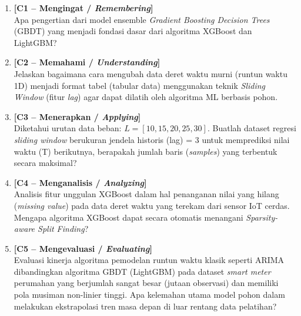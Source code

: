 \documentclass[11pt,a4paper]{article}
\begin{document}
\begin{enumerate}[leftmargin=1.8em, label=\textbf{Soal \arabic*.}]
    
    \item \textbf{[C1 -- Mengingat / \textit{Remembering}]} \\
    Apa pengertian dari model ensemble \textit{Gradient Boosting Decision Trees} (GBDT) yang menjadi fondasi dasar dari algoritma XGBoost dan LightGBM?
    \vspace{2.2cm}

    \item \textbf{[C2 -- Memahami / \textit{Understanding}]} \\
    Jelaskan bagaimana cara mengubah data deret waktu murni (runtun waktu 1D) menjadi format tabel (tabular data) menggunakan teknik \textit{Sliding Window} (fitur \textit{lag}) agar dapat dilatih oleh algoritma ML berbasis pohon.
    \vspace{2.8cm}

    \item \textbf{[C3 -- Menerapkan / \textit{Applying}]} \\
    Diketahui urutan data beban: $L = [10, 15, 20, 25, 30]$. Buatlah dataset regresi \textit{sliding window} berukuran jendela historis (lag) = 3 untuk memprediksi nilai waktu (T) berikutnya, berapakah jumlah baris (\textit{samples}) yang terbentuk secara maksimal?
    \vspace{2.8cm}

    \newpage

    \item \textbf{[C4 -- Menganalisis / \textit{Analyzing}]} \\
    Analisis fitur unggulan XGBoost dalam hal penanganan nilai yang hilang (\textit{missing value}) pada data deret waktu yang terekam dari sensor IoT cerdas. Mengapa algoritma XGBoost dapat secara otomatis menangani \textit{Sparsity-aware Split Finding}?
    \vspace{3.5cm}

    \item \textbf{[C5 -- Mengevaluasi / \textit{Evaluating}]} \\
    Evaluasi kinerja algoritma pemodelan runtun waktu klasik seperti ARIMA dibandingkan algoritma GBDT (LightGBM) pada dataset \textit{smart meter} perumahan yang berjumlah sangat besar (jutaan observasi) dan memiliki pola musiman non-linier tinggi. Apa kelemahan utama model pohon dalam melakukan ekstrapolasi tren masa depan di luar rentang data pelatihan?
    \vspace{3.5cm}


\end{enumerate}
\end{document}
